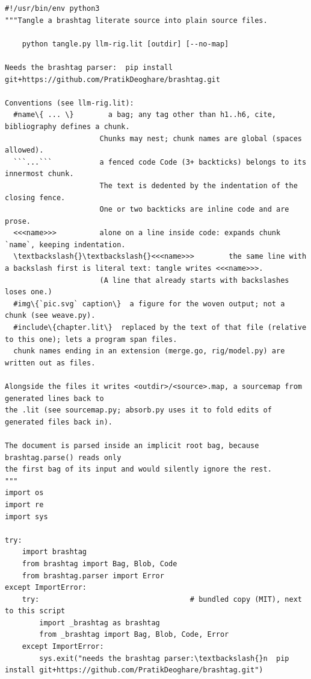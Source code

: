 \documentclass[10pt,a4paper]{article}
\newcounter{chunk}
\begin{document}
\begin{Verbatim}
#!/usr/bin/env python3
"""Tangle a brashtag literate source into plain source files.

    python tangle.py llm-rig.lit [outdir] [--no-map]

Needs the brashtag parser:  pip install git+https://github.com/PratikDeoghare/brashtag.git

Conventions (see llm-rig.lit):
  #name\{ ... \}        a bag; any tag other than h1..h6, cite, bibliography defines a chunk.
                      Chunks may nest; chunk names are global (spaces allowed).
  ```...```           a fenced code Code (3+ backticks) belongs to its innermost chunk.
                      The text is dedented by the indentation of the closing fence.
                      One or two backticks are inline code and are prose.
  <<<name>>>          alone on a line inside code: expands chunk `name`, keeping indentation.
  \textbackslash{}\textbackslash{}<<<name>>>        the same line with a backslash first is literal text: tangle writes <<<name>>>.
                      (A line that already starts with backslashes loses one.)
  #img\{`pic.svg` caption\}  a figure for the woven output; not a chunk (see weave.py).
  #include\{chapter.lit\}  replaced by the text of that file (relative to this one); lets a program span files.
  chunk names ending in an extension (merge.go, rig/model.py) are written out as files.

Alongside the files it writes <outdir>/<source>.map, a sourcemap from generated lines back to
the .lit (see sourcemap.py; absorb.py uses it to fold edits of generated files back in).

The document is parsed inside an implicit root bag, because brashtag.parse() reads only
the first bag of its input and would silently ignore the rest.
"""
import os
import re
import sys

try:
    import brashtag
    from brashtag import Bag, Blob, Code
    from brashtag.parser import Error
except ImportError:
    try:                                   # bundled copy (MIT), next to this script
        import _brashtag as brashtag
        from _brashtag import Bag, Blob, Code, Error
    except ImportError:
        sys.exit("needs the brashtag parser:\textbackslash{}n  pip install git+https://github.com/PratikDeoghare/brashtag.git")
\end{Verbatim}
\end{document}
